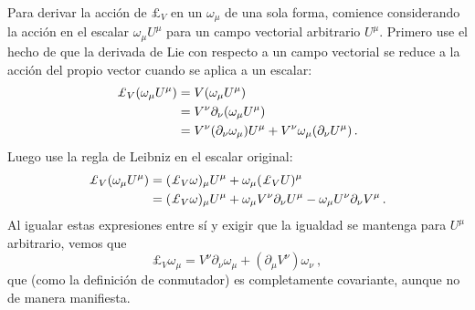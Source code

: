 \documentclass[11pt,b5paper,openany,twoside]{book}
\newcommand{\p}[1]{{\partial_{#1}}}
\def\lie{\pounds}
\begin{document}
Para derivar la acción de $\lie_V$ en un $\omega_\mu$ de una sola forma, comience considerando la acción en el escalar $\omega_\mu U^\mu$ para un campo vectorial arbitrario $U^\mu$.
Primero use el hecho de que la derivada de Lie con respecto a un campo vectorial se reduce a la acción del propio vector cuando se aplica a un escalar:
\begin{align}
\lie_V(\omega_\mu U^\mu)  &=  V(\omega_\mu U^\mu) \notag \\
&=  V^\nu\p\nu(\omega_\mu U^\mu) \notag \\
&=  V^\nu(\p\nu\omega_\mu)U^\mu + V^\nu\omega_\mu(\p\nu U^\mu)\,.
\label{5.28}
\end{align}
Luego use la regla de Leibniz en el escalar original:
\begin{align}
\lie_V(\omega_\mu U^\mu)  &=  (\lie_V\omega)_\mu U^\mu
+\omega_\mu (\lie_V U)^\mu  \notag \\
&=  (\lie_V\omega)_\mu U^\mu + \omega_\mu V^\nu\p\nu U^\mu
-\omega_\mu U^\nu\p\nu V^\mu\,.\label{5.29}
\end{align}
Al igualar estas expresiones entre sí y exigir que la igualdad se mantenga para $U^\mu$ arbitrario, vemos que
\begin{equation}
\lie_V \omega_\mu = V^\nu\p\nu \omega_\mu + (\p\mu V^\nu)
\omega_\nu\ ,\label{5.30}
\end{equation}
que (como la definición de conmutador) es completamente covariante, aunque no de manera manifiesta.
\end{document}
